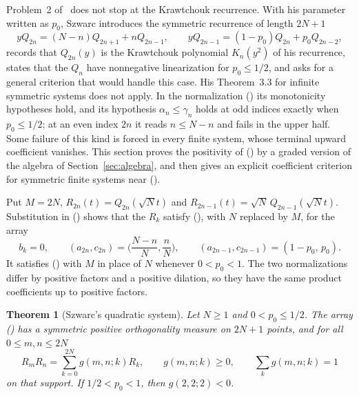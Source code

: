 \documentclass[twoside,10pt]{article}
\makeatletter
\numberwithin{equation}{section}
\theoremstyle{slbody}
\newtheorem{theorem}{Theorem}[section]
\theoremstyle{definition}
\theoremstyle{remark}
\renewcommand{\section}{\@startsection{section}{1}{\z@}{-3.5ex \@plus -1ex \@minus -.2ex}{2.3ex \@plus .2ex}{\normalfont\large\bfseries}}
\renewcommand{\eqref}[1]{\textup{{\normalfont(\oldstylenums{\ref{#1}}}\normalfont)}}
\makeatother
\begin{document}
\section{Szwarc's quadratic system}\label{sec:szwarc}

Problem~2 of~\cite[\S5]{szwarc} does not stop at the Krawtchouk recurrence. With his parameter written as $p_0$, Szwarc introduces the symmetric recurrence of length $2N+1$
\begin{equation}\label{eq:szwarc-q}
yQ_{2n}=(N-n)Q_{2n+1}+nQ_{2n-1},\qquad
yQ_{2n-1}=(1-p_0)Q_{2n}+p_0Q_{2n-2},
\end{equation}
records that $Q_{2n}(y)$ is the Krawtchouk polynomial $K_n(y^2)$ of his recurrence, states that the $Q_n$ have nonnegative linearization for $p_0\leq1/2$, and asks for a general criterion that would handle this case. His Theorem~3.3 for infinite symmetric systems does not apply. In the normalization \eqref{eq:szwarc-q} its monotonicity hypotheses hold, and its hypothesis $\alpha_n\leq\gamma_n$ holds at odd indices exactly when $p_0\leq1/2$; at an even index $2n$ it reads $n\leq N-n$ and fails in the upper half. Some failure of this kind is forced in every finite system, whose terminal upward coefficient vanishes. This section proves the positivity of \eqref{eq:szwarc-q} by a graded version of the algebra of Section~\ref{sec:algebra}, and then gives an explicit coefficient criterion for symmetric finite systems near \eqref{eq:szwarc-q}.

Put $M=2N$, $R_{2n}(t)=Q_{2n}(\sqrt Nt)$ and $R_{2n-1}(t)=\sqrt N\,Q_{2n-1}(\sqrt Nt)$. Substitution in \eqref{eq:szwarc-q} shows that the $R_k$ satisfy \eqref{eq:recurrence}, with $N$ replaced by $M$, for the array
\begin{equation}\label{eq:qarray}
b_k=0,\qquad
(a_{2n},c_{2n})=\Big(\frac{N-n}{N},\frac nN\Big),\qquad
(a_{2n-1},c_{2n-1})=(1-p_0,\,p_0).
\end{equation}
It satisfies \eqref{eq:basic} with $M$ in place of $N$ whenever $0<p_0<1$. The two normalizations differ by positive factors and a positive dilation, so they have the same product coefficients up to positive factors.

\begin{theorem}[Szwarc's quadratic system]\label{thm:szwarc}
Let $N\geq1$ and $0<p_0\leq1/2$. The array \eqref{eq:qarray} has a symmetric positive orthogonality measure on $2N+1$ points, and for all $0\leq m,n\leq 2N$
\[
R_mR_n=\sum_{k=0}^{2N}g(m,n;k)R_k,\qquad g(m,n;k)\geq0,\qquad\sum_k g(m,n;k)=1
\]
on that support. If $1/2<p_0<1$, then $g(2,2;2)<0$.
\end{theorem}
\end{document}
